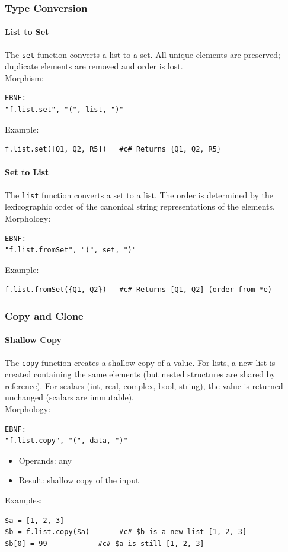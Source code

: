 \subsubsection{Type Conversion}
\paragraph{List to Set}
The \texttt{set} function converts a list to a set. All unique elements are preserved; duplicate elements are removed and order is lost. \\
Morphism:
\begin{verbatim}
EBNF:
"f.list.set", "(", list, ")"
\end{verbatim}
Example:
\begin{verbatim}
f.list.set([Q1, Q2, R5])   #c# Returns {Q1, Q2, R5}
\end{verbatim}

\paragraph{Set to List}
The \texttt{list} function converts a set to a list. The order is determined by the lexicographic order of the canonical string representations of the elements. \\
Morphology:
\begin{verbatim}
EBNF:
"f.list.fromSet", "(", set, ")"
\end{verbatim}
Example:
\begin{verbatim}
f.list.fromSet({Q1, Q2})   #c# Returns [Q1, Q2] (order from *e)
\end{verbatim}

\subsubsection{Copy and Clone}
\paragraph{Shallow Copy}
The \texttt{copy} function creates a shallow copy of a value. For lists, a new list is created containing the same elements (but nested structures are shared by reference). For scalars (int, real, complex, bool, string), the value is returned unchanged (scalars are immutable).\\
Morphology:
\begin{verbatim}
EBNF:
"f.list.copy", "(", data, ")"
\end{verbatim}
\begin{itemize}
\item Operands: any
\item Result: shallow copy of the input
\end{itemize}
Examples:
\begin{verbatim}
$a = [1, 2, 3]
$b = f.list.copy($a)       #c# $b is a new list [1, 2, 3]
$b[0] = 99            #c# $a is still [1, 2, 3]
\end{verbatim}

